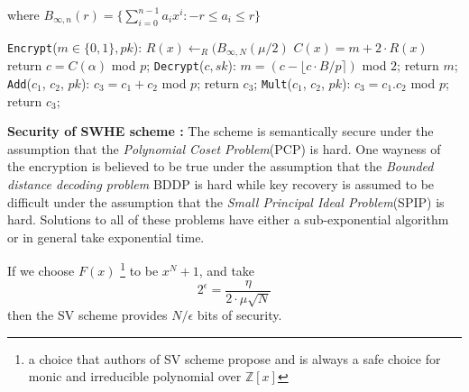 \documentclass{acm_proc_article-sp}
\begin{document}
where $ B_{\infty , n}(r) = \{\sum_{i=0}^{n-1}{a_i}x^i : -r \leq a_i \leq r \} $

\texttt{Encrypt}($m \in \{0,1\} , pk$): 
\newline \phantom{x}\hspace{3ex}  $R(x) \leftarrow_{R}(B_{\infty , N}(\mu/2)$
 \; $C(x)=m+2\cdot R(x)$ 
\newline \phantom{x}\hspace{3ex} return  $c=C(\alpha)$ mod $p$;
\newline \texttt{Decrypt}($c, sk$):
\newline \phantom{x}\hspace{3ex} $m = (c - \lfloor c \cdot B/p \rceil )$ mod $2$;
\phantom{x}\hspace{1ex} return $m$;
\newline \texttt{Add}($c_1$, $c_2$, $pk$):
\newline \phantom{x}\hspace{3ex} $c_3=c_1+c_2$ mod $p$; 
\phantom{x}\hspace{1ex}  return $c_3$;
\newline \texttt{Mult}($c_1$, $c_2$, $pk$):
 \newline \phantom{x}\hspace{3ex}  $c_3=c_1.c_2$ mod $p$; 
\phantom{x}\hspace{1ex}  return $c_3$;

\textbf{Security of SWHE scheme :} The scheme is semantically secure under the assumption that the \textit{Polynomial Coset Problem}(PCP) is hard. One wayness of the encryption is believed to be true under the assumption that the \textit{Bounded distance decoding problem} BDDP is hard while key recovery is assumed to be difficult under the assumption that the \textit{Small Principal Ideal Problem}(SPIP) is hard. Solutions to all of these problems have either a sub-exponential algorithm or in general take exponential time.

If we choose $F(x)$ \footnote{a choice that authors of SV scheme propose and is always a safe choice for monic and irreducible polynomial over $\mathbb{Z}[x] $} to be $x^N+1$, and take \begin{equation}2 ^ \epsilon = \frac{\eta}{2\cdot \mu \sqrt{N}} \end{equation} then the SV scheme provides $N /\epsilon$ bits of security.
\end{document}
